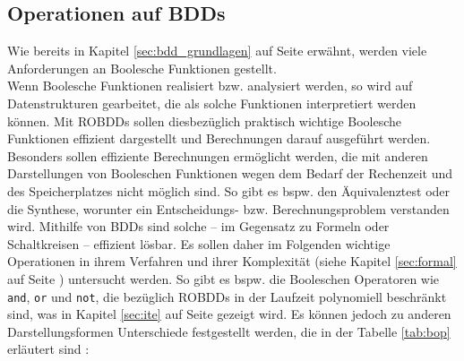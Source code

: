 \subsection{Operationen auf BDDs}
\label{sec:operationen}
Wie bereits in Kapitel \ref{sec:bdd_grundlagen} auf Seite \pageref{sec:bdd_grundlagen} erwähnt, werden viele Anforderungen an Boolesche Funktionen gestellt.\\
Wenn Boolesche Funktionen realisiert bzw. analysiert werden, so wird auf Datenstrukturen gearbeitet, die als solche Funktionen interpretiert werden können. Mit ROBDDs sollen diesbezüglich praktisch wichtige Boolesche Funktionen effizient dargestellt und Berechnungen darauf ausgeführt werden. Besonders sollen effiziente Berechnungen ermöglicht werden, die mit anderen Darstellungen von Booleschen Funktionen wegen dem Bedarf der Rechenzeit und des Speicherplatzes nicht möglich sind. So gibt es bspw. den Äquivalenztest oder die Synthese, worunter ein Entscheidungs- bzw. Berechnungsproblem verstanden wird. Mithilfe von BDDs sind solche -- im Gegensatz zu Formeln oder Schaltkreisen -- effizient lösbar. Es sollen daher im Folgenden wichtige Operationen in ihrem Verfahren und ihrer Komplexität (siehe Kapitel \ref{sec:formal} auf Seite \pageref{sec:formal}) untersucht werden. So gibt es bspw. die Booleschen Operatoren wie \texttt{and}, \texttt{or} und \texttt{not}, die bezüglich ROBDDs in der Laufzeit polynomiell beschränkt sind, was in Kapitel \ref{sec:ite} auf Seite \pageref{sec:ite} gezeigt wird. Es können jedoch zu anderen Darstellungsformen Unterschiede festgestellt werden, die in der Tabelle \ref{tab:bop} erläutert sind \cite{m2007}:
